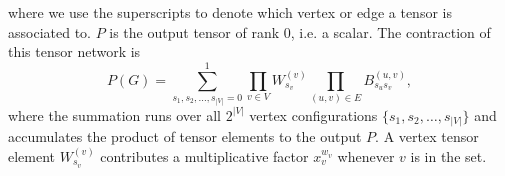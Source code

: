 \documentclass[review, onefignum, onetabnum]{siamart190516}
\begin{document}
where we use the superscripts to denote which vertex or edge a tensor is associated to.
$P$ is the output tensor of rank $0$, i.e. a scalar.
The contraction of this tensor network is
\begin{equation}\label{eq:idp}
    P(G) = \sum\limits_{s_1, s_2, \ldots, s_{|V|} = 0}^{1} \prod\limits_{v\in V} W^{(v)}_{s_v} \prod\limits_{(u,v) \in E} B^{(u,v)}_{s_u s_v},
\end{equation}
where the summation runs over all $2^{|V|}$ vertex configurations $\{s_1, s_{2}, \ldots,s_{|V|}\}$ and accumulates the product of tensor elements to the output $P$. 
A vertex tensor element $W^{(v)}_{s_v}$ contributes a multiplicative factor $x_v^{w_v}$ whenever $v$ is in the set.
\end{document}
